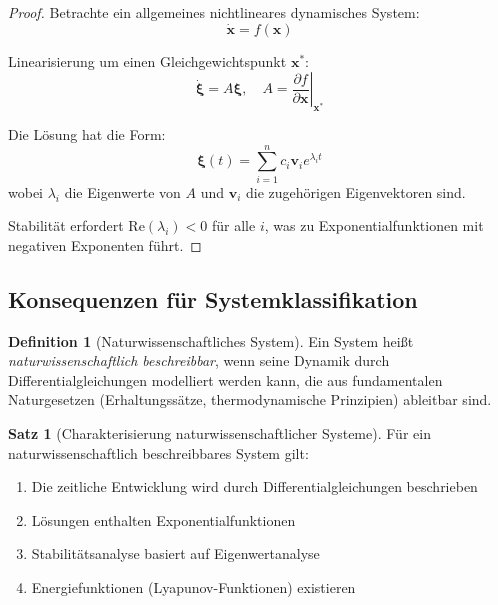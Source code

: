 ﻿\documentclass[a4paper,12pt]{report}
\theoremstyle{definition}
\newtheorem{definition}{Definition}[section]
\newtheorem{satz}{Satz}[section]
\begin{document}
\begin{proof}
	Betrachte ein allgemeines nichtlineares dynamisches System:
	\begin{equation}
		\dot{\mathbf{x}} = f(\mathbf{x})
	\end{equation}
	
	Linearisierung um einen Gleichgewichtspunkt $\mathbf{x}^*$:
	\begin{equation}
		\dot{\mathbf{\xi}} = A \mathbf{\xi}, \quad A = \left. \frac{\partial f}{\partial \mathbf{x}} \right|_{\mathbf{x}^*}
	\end{equation}
	
	Die Lösung hat die Form:
	\begin{equation}
		\mathbf{\xi}(t) = \sum_{i=1}^{n} c_i \mathbf{v}_i e^{\lambda_i t}
	\end{equation}
	wobei $\lambda_i$ die Eigenwerte von $A$ und $\mathbf{v}_i$ die zugehörigen Eigenvektoren sind.
	
	Stabilität erfordert $\text{Re}(\lambda_i) < 0$ für alle $i$, was zu Exponentialfunktionen mit negativen Exponenten führt.
\end{proof}

\subsection{Konsequenzen für Systemklassifikation}

\begin{definition}[Naturwissenschaftliches System]
	Ein System heißt \textit{naturwissenschaftlich beschreibbar}, wenn seine Dynamik durch Differentialgleichungen modelliert werden kann, die aus fundamentalen Naturgesetzen (Erhaltungssätze, thermodynamische Prinzipien) ableitbar sind.
\end{definition}

\begin{satz}[Charakterisierung naturwissenschaftlicher Systeme]
	Für ein naturwissenschaftlich beschreibbares System gilt:
	\begin{enumerate}
		\item[-] Die zeitliche Entwicklung wird durch Differentialgleichungen beschrieben
		\item[-] Lösungen enthalten Exponentialfunktionen
		\item[-] Stabilitätsanalyse basiert auf Eigenwertanalyse
		\item[-] Energiefunktionen (Lyapunov-Funktionen) existieren
	\end{enumerate}
\end{satz}
\end{document}
